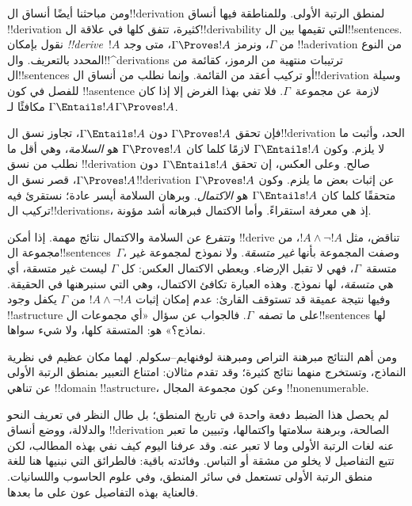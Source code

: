 \documentclass[../../../include/open-logic-section]{subfiles}
\begin{document}


ومن مباحثنا أيضًا أنساق ال!!{derivation} لمنطق الرتبة الأولى.
وللمناطقة فيها أنساق !!{derivation} كثيرة، تتفق كلها في علاقة
ال!!{derivability} التي تقيمها بين ال!!{sentence}s. نقول بإمكان
\emph{!!{derive}}~$!A$ من $\Gamma$، ونرمز
$\Gamma \Proves !A$، متى وجد !!a{derivation} من النوع المحدد
بالتعريف. وال!!^{derivation}s ترتيبات منتهية من الرموز، كقائمة من
ال!!{sentence}s أو تركيب أعقد من القائمة. وإنما نطلب من أنساق
ال!!{derivation} وسيلة للفصل في كون !!a{sentence} لازمة عن
مجموعة~$\Gamma$. فلا تفي بهذا الغرض إلا إذا كان
$\Gamma \Entails !A$ مكافئًا لـ$\Gamma \Proves !A$.

فإن تحقق $\Gamma \Proves !A$ دون $\Gamma \Entails !A$،
تجاوز نسق ال!!{derivation} الحد، وأثبت ما لا يلزم.
وكون $\Gamma \Entails !A$ لازمًا كلما كان
$\Gamma \Proves !A$ هو \emph{السلامة}، وهي أقل ما نطلب من
نسق !!{derivation} صالح. وعلى العكس، إن تحقق
$\Gamma \Entails !A$ دون $\Gamma \Proves !A$، قصر نسق
ال!!{derivation} عن إثبات بعض ما يلزم. وكون
$\Gamma \Proves !A$ متحققًا كلما كان $\Gamma \Entails !A$
هو \emph{الاكتمال}. وبرهان السلامة أيسر عادة؛ نستقرئ فيه تركيب
ال!!{derivation}s، إذ هي معرفة استقراءً. وأما الاكتمال فبرهانه
أشد مؤونة.

وتتفرع عن السلامة والاكتمال نتائج مهمة. إذا أمكن !!{derive}
تناقض، مثل $!A \land \lnot !A$، من مجموعة ال!!{sentence}s~$\Gamma$،
وصفت المجموعة بأنها \emph{غير متسقة}. ولا نموذج لمجموعة
غير متسقة~$\Gamma$، فهي لا تقبل الإرضاء. ويعطي الاكتمال
العكس: كل $\Gamma$ ليست غير متسقة، أي هي \emph{متسقة}،
لها نموذج. وهذه العبارة تكافئ الاكتمال، وهي التي سنبرهنها
في الحقيقة. وفيها نتيجة عميقة قد تستوقف القارئ: عدم إمكان إثبات
$!A \land \lnot !A$ من $\Gamma$ يكفل وجود
!!a{structure} على ما تصفه~$\Gamma$.
فالجواب عن سؤال «أي مجموعات ال!!{sentence}s لها نماذج؟»
هو: المتسقة كلها، ولا شيء سواها.

ومن أهم النتائج مبرهنة التراص ومبرهنة لوفنهايم--سكولم. لهما
مكان عظيم في نظرية النماذج، وتستخرج منهما نتائج كثيرة؛ وقد
تقدم مثالان: امتناع التعبير بمنطق الرتبة الأولى عن تناهي
!!{domain} !!a{structure}، وعن كون مجموعة المجال
!!{nonenumerable}.

لم يحصل هذا الضبط دفعة واحدة في تاريخ المنطق؛ بل طال النظر
في تعريف النحو والدلالة، ووضع أنساق !!{derivation} الصالحة،
وبرهنة سلامتها واكتمالها، وتبيين ما تعبر عنه لغات الرتبة الأولى
وما لا تعبر عنه. وقد عرفنا اليوم كيف نفي بهذه المطالب،
لكن تتبع التفاصيل لا يخلو من مشقة أو التباس. وفائدته باقية:
فالطرائق التي نبنيها هنا للغة منطق الرتبة الأولى تستعمل في
سائر المنطق، وفي علوم الحاسوب واللسانيات. فالعناية بهذه
التفاصيل عون على ما بعدها.
\end{document}
